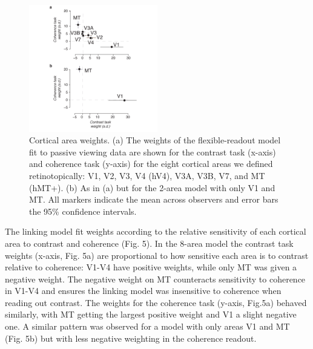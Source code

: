 \documentclass{report}
\begin{document}
\begin{figure}
\centering
\includegraphics[keepaspectratio,width=0.5\textwidth]{figs_c2/Fig5_weights.pdf}
\caption[Cortical area weights]{Cortical area weights. (a) The weights of the flexible-readout model fit to passive viewing data are shown for the contrast task (x-axis) and coherence task (y-axis) for the eight cortical areas we defined retinotopically: V1, V2, V3, V4 (hV4), V3A, V3B, V7, and MT (hMT+). (b) As in (a) but for the 2-area model with only V1 and MT. All markers indicate the mean across observers and error bars the 95\% confidence intervals.}
\label{fig:c4f5}
\end{figure}

The linking model fit weights according to the relative sensitivity of each cortical area to contrast and coherence (Fig. 5). In the 8-area model the contrast task weights (x-axis, Fig. 5a) are proportional to how sensitive each area is to contrast relative to coherence: V1-V4 have positive weights, while only MT was given a negative weight. The negative weight on MT counteracts sensitivity to coherence in V1-V4 and ensures the linking model was insensitive to coherence when reading out contrast. The weights for the coherence task (y-axis, Fig.5a) behaved similarly, with MT getting the largest positive weight and V1 a slight negative one. A similar pattern was observed for a model with only areas V1 and MT (Fig. 5b) but with less negative weighting in the coherence readout.  
\end{document}
